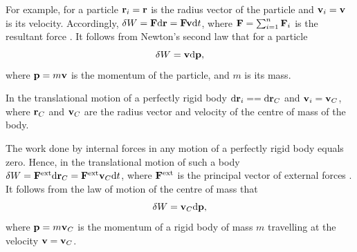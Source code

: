 For example, for a particle $\vb{r}_{i} = \vb{r}$ is the radius vector of the particle and $\vb{v}_{i} = \vb{v}$ is its velocity. Accordingly, $\var{W} = \vb{F} \dd \vb{r} = \vb{Fv}\dd t$, where $\vb{F} = \sum_{i=1}^{n} \vb{F}_{i}$ is the resultant force . It follows from Newton's second law  that for a particle
\begin{equation*}%
\var{W}= \vb{v} \dd \vb{p},
\end{equation*}
where $\vb{p} = m \vb{v}$ is the momentum of the particle, and $m$ is its mass.

In the translational motion of a perfectly rigid body $\dd \vb{r}_{i} = = \dd \vb{r}_{C}$ and $\vb{v}_{i} = \vb{v}_{C}$, where $\vb{r}_{C}$ and $\vb{v}_{C}$ are the radius vector and velocity of the centre of mass  of the body.

The work done by internal forces in any motion of a perfectly rigid body equals zero. Hence, in the translational motion of such a body $\var{W} = \vb{F}^{\textrm{ext}} \dd \vb{r}_{C} = \vb{F}^{\textrm{ext}}\vb{v}_{C} \dd t$, where $\vb{F}^{\textrm{ext}}$ is the principal vector of external forces . It follows from the law of motion of the centre of mass  that
\begin{equation*}%
\var{W} = \vb{v}_{C} \dd \vb{p},
\end{equation*}
where $\vb{p} = m\vb{v}_{C}$ is the momentum of a rigid body of mass $m$ travelling at the velocity $\vb{v} = \vb{v}_{C}$.


